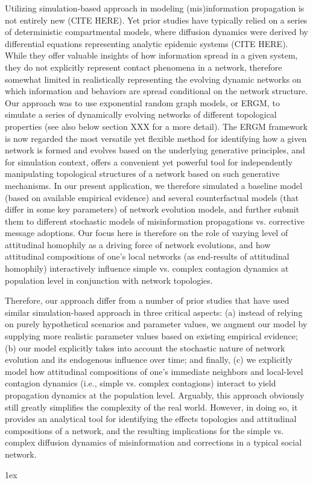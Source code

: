\documentclass[man, 12pt, a4paper, noextraspace]{apa6}
\begin{document}
    Utilizing simulation-based approach in modeling (mis)information propagation is not entirely new (CITE HERE). Yet prior studies have typically relied on a series of deterministic compartmental models, where diffusion dynamics were derived by differential equations representing analytic epidemic systems (CITE HERE). While they offer valuable insights of how information spread in a given system, they do not explicitly represent contact phenomena in a network, therefore somewhat limited in realistically representing the evolving dynamic networks on which information and behaviors are spread conditional on the network structure. Our approach was to use exponential random graph models, or ERGM, to simulate a series of dynamically evolving networks of different topological properties (see also below section XXX for a more detail). The ERGM framework is now regarded the most versatile yet flexible method for identifying how a given network is formed and evolves based on the underlying generative principles, and for simulation context, offers a convenient yet powerful tool for independently manipulating topological structures of a network based on such generative mechanisms. In our present application, we therefore simulated a baseline model (based on available empirical evidence) and several counterfactual models (that differ in some key parameters) of network evolution models, and further submit them to different stochastic models of misinformation propagations vs. corrective message adoptions. Our focus here is therefore on the role of varying level of attitudinal homophily as a driving force of network evolutions, and how attitudinal compositions of one's local networks (as end-results of attitudinal homophily) interactively influence simple vs. complex contagion dynamics at population level in conjunction with network topologies.
    
    Therefore, our approach differ from a number of prior studies that have used similar simulation-based approach in three critical aspects: (a) instead of relying on purely hypothetical scenarios and parameter values, we augment our model by supplying more realistic parameter values based on existing empirical evidence; (b) our model explicitly takes into account the stochastic nature of network evolution and its endogenous influence over time; and finally, (c) we explicitly model how attitudinal compositions of one's immediate neighbors and local-level contagion dynamics (i.e., simple vs. complex contagions) interact to yield propagation dynamics at the population level. Arguably, this approach obviously still greatly simplifies the complexity of the real world. However, in doing so, it provides an analytical tool for identifying the effects topologies and attitudinal compositions of a network, and the resulting implications for the simple vs. complex diffusion dynamics of misinformation and corrections in a typical social network.


\printbibliography
\newpage
\begingroup
\parindent 0pt
\parskip 1ex
\def\enotesize{\normalsize}
\theendnotes
\endgroup
\end{document}
